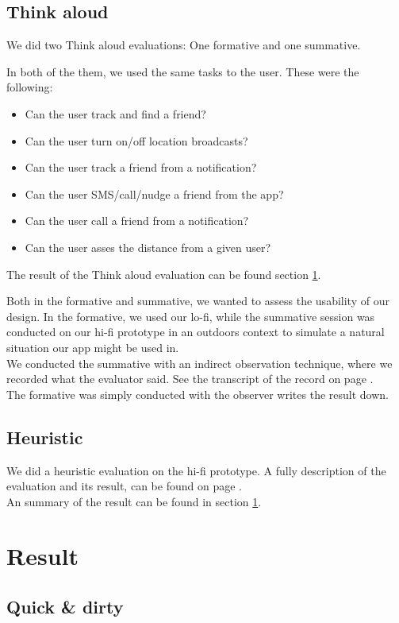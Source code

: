 \documentclass[runningheads,a4paper]{llncs}
\begin{document}
\subsection*{Think aloud}
We did two Think aloud evaluations: One formative and one summative.

In both of the them, we used the same tasks to the user. These were the following: 

\begin{itemize}
\item Can the user track and find a friend? 
\item Can the user turn on/off location broadcasts? 
\item Can the user track a friend from a notification?
\item Can the user SMS/call/nudge a friend from the app?
\item Can the user call a friend from a notification?
\item Can the user asses the distance from a given user?
\end{itemize}
The result of the Think aloud evaluation can be found section \ref{result}. 

Both in the formative and summative, we wanted to assess the usability of our design. In the formative, we used our lo-fi, while the summative session was conducted on our hi-fi prototype in an outdoors context to simulate a natural situation our app might be used in.\\
We conducted the summative with an indirect observation technique, where we recorded what the evaluator said. See the transcript of the record on page \pageref{transcript}. \\
The formative was simply conducted with the observer writes the result down. 


\subsection*{Heuristic}
We did a heuristic evaluation on the hi-fi prototype. A fully description of the evaluation and its result, can be found on page \pageref{heuristic}. \\
An summary of the result can be found in section \ref{result}.
\section{Result}\label{result}
\subsection*{Quick \& dirty}
\end{document}
